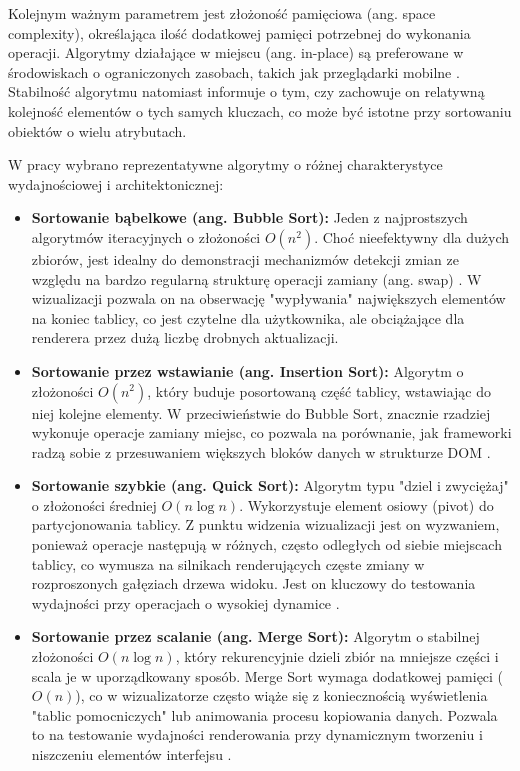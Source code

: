 \documentclass[12pt,openright,twoside]{report}
\begin{document}
Kolejnym ważnym parametrem jest złożoność pamięciowa (ang. space complexity), określająca ilość dodatkowej pamięci potrzebnej do wykonania operacji. Algorytmy działające w miejscu (ang. in-place) są preferowane w środowiskach o ograniczonych zasobach, takich jak przeglądarki mobilne \cite{High_Perf_JS}. Stabilność algorytmu natomiast informuje o tym, czy zachowuje on relatywną kolejność elementów o tych samych kluczach, co może być istotne przy sortowaniu obiektów o wielu atrybutach.

W pracy wybrano reprezentatywne algorytmy o różnej charakterystyce wydajnościowej i architektonicznej:
\begin{itemize}
    \item \textbf{Sortowanie bąbelkowe (ang. Bubble Sort):} Jeden z najprostszych algorytmów iteracyjnych o złożoności $O(n^2)$. Choć nieefektywny dla dużych zbiorów, jest idealny do demonstracji mechanizmów detekcji zmian ze względu na bardzo regularną strukturę operacji zamiany (ang. swap) \cite{Sedgewick_Algorithms}. W wizualizacji pozwala on na obserwację "wypływania" największych elementów na koniec tablicy, co jest czytelne dla użytkownika, ale obciążające dla renderera przez dużą liczbę drobnych aktualizacji.
    \item \textbf{Sortowanie przez wstawianie (ang. Insertion Sort):} Algorytm o złożoności $O(n^2)$, który buduje posortowaną część tablicy, wstawiając do niej kolejne elementy. W przeciwieństwie do Bubble Sort, znacznie rzadziej wykonuje operacje zamiany miejsc, co pozwala na porównanie, jak frameworki radzą sobie z przesuwaniem większych bloków danych w strukturze DOM \cite{Mastering_JS_Arrays}.
    \item \textbf{Sortowanie szybkie (ang. Quick Sort):} Algorytm typu "dziel i zwyciężaj" o złożoności średniej $O(n \log n)$. Wykorzystuje element osiowy (pivot) do partycjonowania tablicy. Z punktu widzenia wizualizacji jest on wyzwaniem, ponieważ operacje następują w różnych, często odległych od siebie miejscach tablicy, co wymusza na silnikach renderujących częste zmiany w rozproszonych gałęziach drzewa widoku. Jest on kluczowy do testowania wydajności przy operacjach o wysokiej dynamice \cite{Cormen_Intro}.
    \item \textbf{Sortowanie przez scalanie (ang. Merge Sort):} Algorytm o stabilnej złożoności $O(n \log n)$, który rekurencyjnie dzieli zbiór na mniejsze części i scala je w uporządkowany sposób. Merge Sort wymaga dodatkowej pamięci ($O(n)$), co w wizualizatorze często wiąże się z koniecznością wyświetlenia "tablic pomocniczych" lub animowania procesu kopiowania danych. Pozwala to na testowanie wydajności renderowania przy dynamicznym tworzeniu i niszczeniu elementów interfejsu \cite{Knuth_Sorting}.
\end{itemize}
\end{document}
